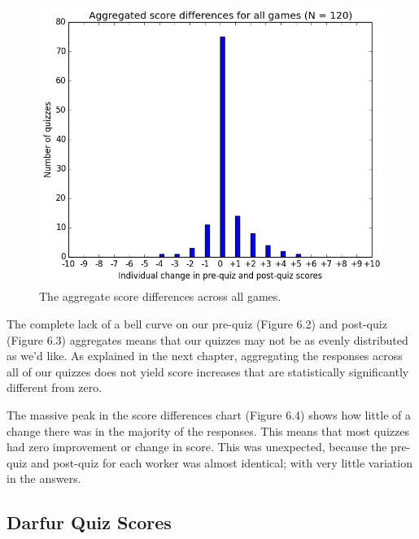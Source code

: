 			\begin{figure}[] 
			\centering 
			\includegraphics[width=\textwidth]{general_results.png} 
			\caption{The aggregate score differences across all games.}
			\end{figure}



			The complete lack of a bell curve on our pre-quiz (Figure 6.2) and post-quiz (Figure 6.3) aggregates means that our quizzes may not be as evenly distributed as we'd like. As explained in the next chapter, aggregating the responses across all of our quizzes does not yield score increases that are statistically significantly different from zero. 

			The massive peak in the score differences chart (Figure 6.4) shows how little of a change there was in the majority of the responses. This means that most quizzes had zero improvement or change in score. This was unexpected, because the pre-quiz and post-quiz for each worker was almost identical; with very little variation in the answers.

			\clearpage

		\subsection{Darfur Quiz Scores}

